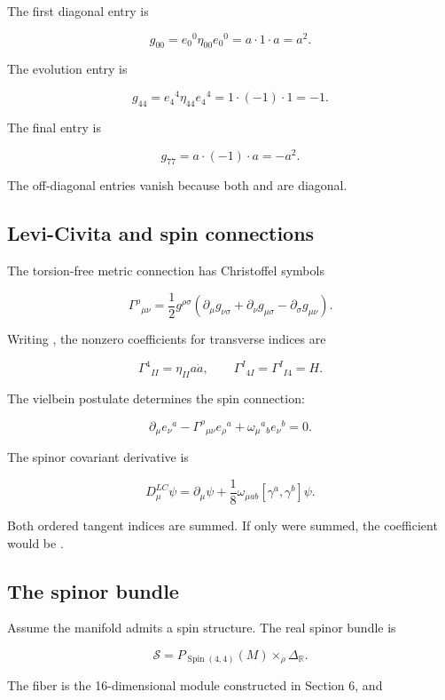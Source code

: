 \documentclass[11pt]{article}
\begin{document}
The first diagonal entry is

\[
g_{00}=e_0{}^0\eta_{00}e_0{}^0=a\cdot1\cdot a=a^2.
\]

The evolution entry is

\[
g_{44}=e_4{}^4\eta_{44}e_4{}^4=1\cdot(-1)\cdot1=-1.
\]

The final entry is

\[
g_{77}=a\cdot(-1)\cdot a=-a^2.
\]

The off-diagonal entries vanish because both \texttt{} and \texttt{} are diagonal.

\subsection{Levi-Civita and spin connections}

The torsion-free metric connection has Christoffel symbols

\[
\Gamma^\rho{}_{\mu\nu}
=\frac12g^{\rho\sigma}
(\partial_\mu g_{\nu\sigma}+\partial_\nu g_{\mu\sigma}
-\partial_\sigma g_{\mu\nu}).
\]

Writing \texttt{}, the nonzero coefficients for transverse indices \texttt{} are

\[
\Gamma^4{}_{II}=\eta_{II}a\dot a,
\qquad
\Gamma^I{}_{4I}=\Gamma^I{}_{I4}=H.
\]

The vielbein postulate determines the spin connection:

\[
\partial_\mu e_\nu{}^a
-\Gamma^\rho{}_{\mu\nu}e_\rho{}^a
+\omega_\mu{}^a{}_b e_\nu{}^b=0.
\]

The spinor covariant derivative is

\[
D^{LC}_\mu\psi
=\partial_\mu\psi
+\frac18\omega_{\mu ab}[\gamma^a,\gamma^b]\psi.
\]

Both ordered tangent indices are summed. If only \texttt{} were summed, the coefficient would be \texttt{}.

\subsection{The spinor bundle}

Assume the manifold admits a spin structure. The real spinor bundle is

\[
\mathcal S=P_{\operatorname{Spin}(4,4)}(M)
\mathbin{\times}_\rho\Delta_{\mathbb R}.
\]

The fiber is the 16-dimensional module constructed in Section 6, and
\end{document}
